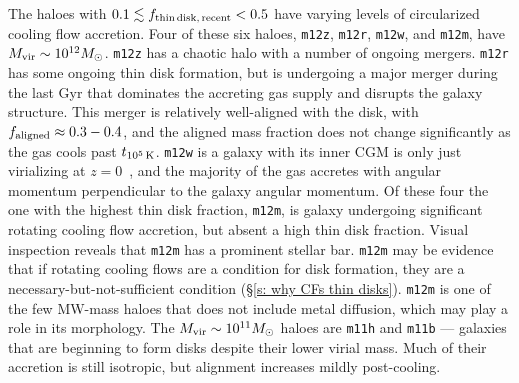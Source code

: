 \documentclass[fleqn,usenatbib]{mnras}
\newcommand{\fthin}{f_{\rm thin\,disk,\,recent}}
\newcommand{\tcools}{t_{10^5\,{\rm K}}}
\begin{document}
The haloes with $0.1 \lesssim \fthin < 0.5$ have varying levels of circularized cooling flow accretion.
Four of these six haloes, \texttt{m12z}, \texttt{m12r}, \texttt{m12w}, and \texttt{m12m}, have $M_{\rm vir} \sim 10^{12} M_\odot$.
\texttt{m12z} has a chaotic halo with a number of ongoing mergers.
\texttt{m12r} has some ongoing thin disk formation, but is undergoing a major merger during the last Gyr that dominates the accreting gas supply and disrupts the galaxy structure.
This merger is relatively well-aligned with the disk, with $f_{\rm aligned} \approx 0.3-0.4$, and the aligned mass fraction does not change significantly as the gas cools past $\tcools$.
\texttt{m12w} is a galaxy with its inner CGM is only just virializing at $z=0$~\citep{Yu2021}, and the majority of the gas accretes with angular momentum perpendicular to the galaxy angular momentum.
Of these four the one with the highest thin disk fraction, \texttt{m12m}, is galaxy undergoing significant rotating cooling flow accretion, but absent a high thin disk fraction.
Visual inspection reveals that \texttt{m12m} has a prominent stellar bar.
\texttt{m12m} may be evidence that if rotating cooling flows are a condition for disk formation, they are a necessary-but-not-sufficient condition (\S\ref{s: why CFs thin disks}).
\texttt{m12m} is one of the few MW-mass haloes that does not include metal diffusion, which may play a role in its morphology.
The $M_{\rm vir} \sim 10^{11} M_\odot$ haloes are \texttt{m11h} and \texttt{m11b} --- galaxies that are beginning to form disks despite their lower virial mass.
Much of their accretion is still isotropic, but alignment increases mildly post-cooling.


\bsp	%
\label{lastpage}
\end{document}
